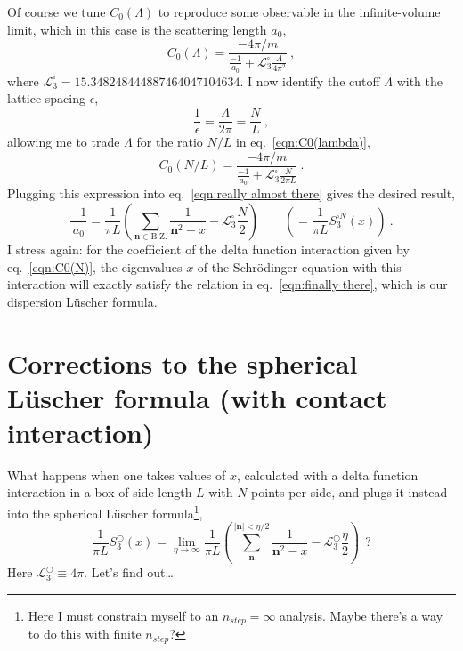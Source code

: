 \documentclass[11pt]{article}
\begin{document}
Of course we tune $C_0(\Lambda)$ to reproduce some observable in the infinite-volume limit, which in this case is the scattering length $a_0$,
\begin{equation}\label{eqn:C0(lambda)}
C_0(\Lambda)=\frac{-4\pi/m}{\frac{-1}{a_0}+\mathcal{L}^\square_3\frac{\Lambda}{4\pi^2}}\ ,
\end{equation}
where $\mathcal{L}^\square_3=15.348248444887464047104634$. I now identify the cutoff $\Lambda$ with the lattice spacing $\epsilon$,
\begin{equation}
\frac{1}{\epsilon}=\frac{\Lambda}{2\pi}=\frac{N}{L}\ ,
\end{equation}
allowing me to trade $\Lambda$ for the ratio $N/L$ in eq.~\eqref{eqn:C0(lambda)},
\begin{equation}\label{eqn:C0(N)}
C_0(N/L)=\frac{-4\pi/m}{\frac{-1}{a_0}+\mathcal{L}^\square_3\frac{N}{2\pi L}}\ .
\end{equation}
Plugging this expression into eq.~\eqref{eqn:really almost there} gives the desired result,
\begin{equation}\label{eqn:finally there}
\frac{-1}{a_0}=\frac{1}{\pi L}\left(\sum_{\bm n\in\mathrm{B.Z.}}\frac{1}{\bm n^2-x}-\mathcal{L}^\square_3\frac{N}{2}\right)\quad\quad\left(=\frac{1}{\pi L}S^{\square N}_3(x)\right)\ .
\end{equation}
I stress again:  for the coefficient of the delta function interaction given by eq.~\eqref{eqn:C0(N)}, the eigenvalues $x$ of the Schr\"odinger equation with this interaction will exactly satisfy the relation in eq.~\eqref{eqn:finally there}, which is our dispersion L\"uscher formula.  

\section{Corrections to the spherical L\"uscher formula (with contact interaction)}
What happens when one takes values of $x$, calculated with a delta function interaction in a box of side length $L$ with $N$ points per side, and plugs it instead into the spherical L\"uscher formula\footnote{Here I must constrain myself to an $n_{step}=\infty$ analysis.  Maybe there's a way to do this with finite $n_{step}$?},
\begin{equation}\label{eqn:spherical luscher}
\frac{1}{\pi L}S^\bigcirc_3(x)=\lim_{\eta \to\infty}\frac{1}{\pi L}\left(\sum_{\bm n}^{|\bm n|<\eta / 2} \frac{1}{\bm n^{2}-x}-\mathcal{L}^\bigcirc_3\frac{\eta}{2}\right)\ \ ?
\end{equation}
Here $\mathcal{L}^{\bigcirc}_3\equiv 4\pi$.  Let's find out\ldots
\end{document}
